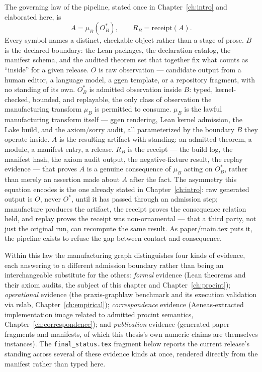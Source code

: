 The governing law of the pipeline, stated once in
Chapter~\ref{ch:intro} and elaborated here, is
\[
A = \mu_B(O^*_B), \qquad R_B = \mathrm{receipt}(A).
\]
Every symbol names a distinct, checkable object rather than a stage of
prose. $B$ is the declared boundary: the Lean packages, the declaration
catalog, the manifest schema, and the audited theorem set that together
fix what counts as ``inside'' for a given release. $O$ is raw
observation --- candidate output from a human editor, a language model,
a ggen template, or a repository fragment, with no standing of its own.
$O^*_B$ is admitted observation inside $B$: typed, kernel-checked,
bounded, and replayable, the only class of observation the manufacturing
transform $\mu_B$ is permitted to consume. $\mu_B$ is the lawful
manufacturing transform itself --- ggen rendering, Lean kernel
admission, the Lake build, and the axiom/sorry audit, all parameterized
by the boundary $B$ they operate inside. $A$ is the resulting artifact
with standing: an admitted theorem, a module, a manifest entry, a
release. $R_B$ is the receipt --- the build log, the manifest hash, the
axiom audit output, the negative-fixture result, the replay evidence ---
that proves $A$ is a genuine consequence of $\mu_B$ acting on $O^*_B$,
rather than merely an assertion made about $A$ after the fact. The
asymmetry this equation encodes is the one already stated in
Chapter~\ref{ch:intro}: raw generated output is $O$, never $O^*$, until
it has passed through an admission step; manufacture produces the
artifact, the receipt proves the consequence relation held, and replay
proves the receipt was non-ornamental --- that a third party, not just
the original run, can recompute the same result. As paper/main.tex puts
it, the pipeline exists to refuse the gap between contact and
consequence.

Within this law the manufacturing graph distinguishes four kinds of
evidence, each answering to a different admission boundary rather than
being an interchangeable substitute for the others: \emph{formal}
evidence (Lean theorems and their axiom audits, the subject of this
chapter and Chapter~\ref{ch:procint}); \emph{operational} evidence (the
praxis-graphlaw benchmark and its execution validation via rslab,
Chapter~\ref{ch:empirical}); \emph{correspondence} evidence
(Aeneas-extracted implementation image related to admitted \textsf{procint}
semantics, Chapter~\ref{ch:correspondence}); and \emph{publication}
evidence (generated paper fragments and manifests, of which this
thesis's own numeric claims are themselves instances). The
\texttt{final\_status.tex} fragment below reports the current release's
standing across several of these evidence kinds at once, rendered
directly from the manifest rather than typed here.

